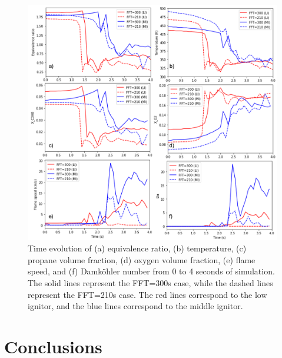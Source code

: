 \documentclass[12pt,letterpaper]{article}
\begin{document}
\begin{flushleft}
\begin{figure}[!h]
\centering
\includegraphics[scale=0.59]{AOSFST_Paper/Figures/LI_MI_Cantera.png}
\caption{Time evolution of (a) equivalence ratio, (b) temperature, (c) propane volume fraction, (d) oxygen volume fraction, (e) flame speed, and (f) Damk\"{o}hler number from 0 to 4 seconds of simulation. The solid lines represent the FFT=300s case, while the dashed lines represent the FFT=210s case. The red lines correspond to the low ignitor, and the blue lines correspond to the middle ignitor. }
\label{fig:LI_MI_Cantera}
\end{figure}

\section{Conclusions}



 



\end{flushleft}
\end{document}
